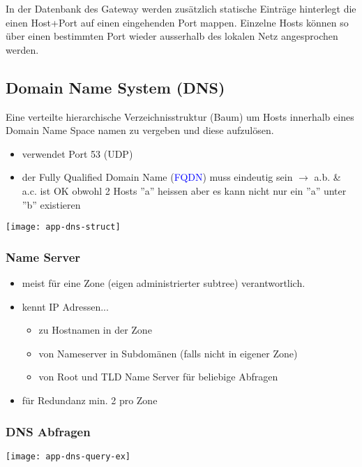 In der Datenbank des Gateway werden zusätzlich statische Einträge hinterlegt 
die einen Host+Port auf einen eingehenden Port mappen. Einzelne Hosts können so
über einen bestimmten Port wieder ausserhalb des lokalen Netz angesprochen werden.


\subsection{Domain Name System (DNS)}

Eine verteilte hierarchische Verzeichnisstruktur (Baum) um
Hosts innerhalb eines Domain Name Space namen zu vergeben und diese aufzulösen.

\begin{itemize}
    \item verwendet Port 53 (UDP)
	\item der Fully Qualified Domain Name (\textcolor{blue}{FQDN}) muss eindeutig
	      sein $\rightarrow$ a.b. \& a.c. ist OK obwohl 2 Hosts ''a'' heissen aber es kann nicht
	      nur ein ''a'' unter ''b'' existieren
\end{itemize}

\texttt{[image: app-dns-struct]}

\subsubsection{Name Server}

\begin{itemize}
    \item meist für eine Zone (eigen administrierter subtree) verantwortlich.
    \item kennt IP Adressen...
        \begin{itemize}
            \item zu Hostnamen in der Zone
            \item von Nameserver in Subdomänen (falls nicht in eigener Zone)
            \item von Root und TLD Name Server für beliebige Abfragen
        \end{itemize}
    \item für Redundanz min. 2 pro Zone
\end{itemize}


\subsubsection{DNS Abfragen}

\texttt{[image: app-dns-query-ex]}


